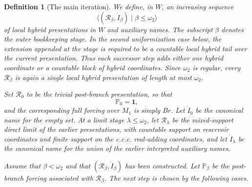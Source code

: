 \documentclass[a4paper,11pt]{article}
\newtheorem{definition}[theorem]{Definition}
\begin{document}
\begin{definition}[The main iteration]\label{def:main-iteration}
We define, in $W$, an increasing sequence
\[
   \langle (\mathcal R_\beta,\dot I_\beta)
      \mid \beta\leq\omega_2\rangle
\]
of local hybrid presentations in $W$ and auxiliary names.  The subscript $\beta$ denotes the outer bookkeeping stage.  In the second uniformization case below, the extension appended at the stage is required to be a countable local hybrid tail over the current presentation.  Thus each successor step adds either one hybrid coordinate or a countable block of hybrid coordinates.  Since $\omega_2$ is regular, every $\mathcal R_\beta$ is again a single local hybrid presentation of length at most $\omega_2$.

Set $\mathcal R_0$ to be the trivial post-branch presentation, so that
\[
   \mathbb P_0=\mathbf 1,
\]
and the corresponding full forcing over $M_1$ is simply $Br$.
Let $\dot I_0$ be the canonical name for the empty set.  At a limit stage $\lambda\leq\omega_2$, let $\mathcal R_\lambda$ be the mixed-support direct limit of the earlier presentations, with countable support on reservoir coordinates and finite support on the c.c.c. real-adding coordinates, and let $\dot I_\lambda$ be the canonical name for the union of the earlier interpreted auxiliary names.

Assume that $\beta<\omega_2$ and that $(\mathcal R_\beta,\dot I_\beta)$ has been constructed.  Let
\(\mathbb P_\beta\) be the post-branch forcing associated with \(\mathcal R_\beta\).
The next step is chosen by the following cases.


\end{definition}
\end{document}
